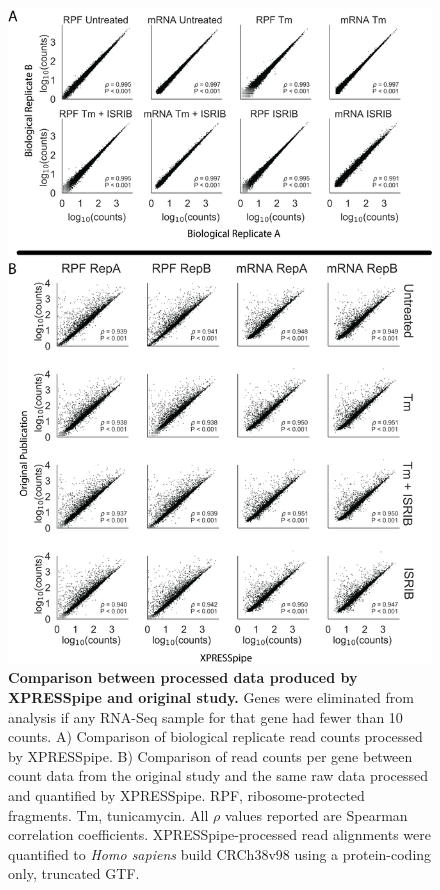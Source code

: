 \documentclass[10pt, oneside]{article}
\begin{document}
\begin{figure}
\centering
  \includegraphics[width=160mm]{figures/xpresspipe_supplement3.png}
  \caption{\textbf{Comparison between processed data produced by XPRESSpipe and original study.} Genes were eliminated from analysis if any RNA-Seq sample for that gene had fewer than 10 counts. A) Comparison of biological replicate read counts processed by XPRESSpipe. B) Comparison of read counts per gene between count data from the original study and the same raw data processed and quantified by XPRESSpipe. RPF, ribosome-protected fragments. Tm, tunicamycin. All $\rho$ values reported are Spearman correlation coefficients. XPRESSpipe-processed read alignments were quantified to \textit{Homo sapiens} build CRCh38v98 using a protein-coding only, truncated GTF.}
  \label{fig:supplement3}
\end{figure}
\end{document}
